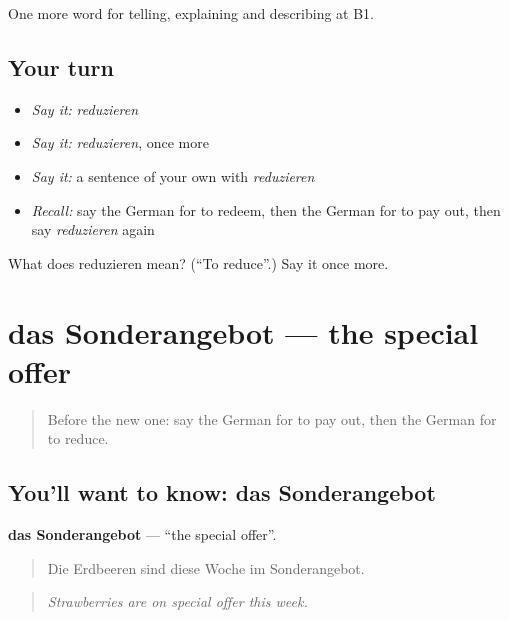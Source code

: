 \begin{grammarlens}[title={What you've built}]
One more word for telling, explaining and describing at B1.
\end{grammarlens}

\subsection*{Your turn}
\begin{itemize}
\raggedright
  \item \emph{Say it:} \emph{reduzieren}
  \item \emph{Say it:} \emph{reduzieren}, once more
  \item \emph{Say it:} a sentence of your own with \emph{reduzieren}
  \item \emph{Recall:} say the German for to redeem, then the German for to pay out, then say \emph{reduzieren} again
\end{itemize}

\begin{tcolorbox}[breakable,colback=teal!4,colframe=teal!35!black,title={Before you move on}]
What does reduzieren mean? (\textquotedblleft{}To reduce\textquotedblright{}.) Say it once more.
\end{tcolorbox}
\section[das Sonderangebot]{das Sonderangebot — the special offer}

\label{lesson:GE-C451-sonderangebot}



\begin{quote}
Before the new one: say the German for to pay out, then the German for to reduce.
\end{quote}

\subsection*{You'll want to know: das Sonderangebot}
\textbf{das Sonderangebot} — \textquotedblleft{}the special offer\textquotedblright{}.

\begin{quote}
Die Erdbeeren sind diese Woche im Sonderangebot.
\end{quote}

\begin{quote}
\emph{Strawberries are on special offer this week.}
\end{quote}

